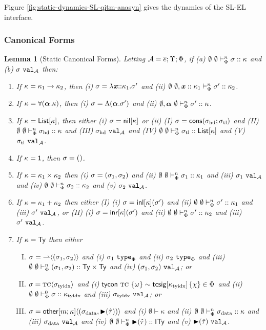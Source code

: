 \documentclass[12pt]{article}
\newtheorem{lemma}{Lemma}
\begin{document}
Figure \ref{fig:static-dynamics-SL-qitm-anasyn} gives the dynamics of the SL-EL interface.

\subsubsection{Canonical Forms}
\begin{lemma}[Static Canonical Forms]
\label{lemma:static-canonical-forms}
Letting $\mathcal{A}=\overline{e};\Upsilon;\Phi$, if (a) $\emptyset~\emptyset \vdash_{\Phi}^{n} \sigma :: \kappa$ and (b) $\sigma~\mathtt{val}_{\mathcal{A}}$ then:
\begin{enumerate}
\item If $\kappa=\kappa_1 \rightarrow \kappa_2$, then (i) $\sigma=\lambda {\textbf{\textit{x}}}{::}\kappa_1.\sigma'$ and (ii) $\emptyset~\emptyset, {\textbf{\textit{x}}} :: \kappa_1 \vdash_{\Phi}^{n} \sigma' :: \kappa_2$.
\item If $\kappa=\forall(\boldsymbol{\alpha}.\kappa)$, then (i) $\sigma=\Lambda(\boldsymbol{\alpha}.\sigma')$ and (ii) $\emptyset, \boldsymbol{\alpha}~\emptyset \vdash_{\Phi}^{n} \sigma' :: \kappa$.
\item If $\kappa={\sf List}[\kappa]$, then either (i) $\sigma={\sf nil}[\kappa]$ or (ii) (I) $\sigma={\sf cons}(\sigma_\text{hd}; \sigma_\text{tl})$ and (II) $\emptyset~\emptyset \vdash_{\Phi}^{n} \sigma_\text{hd} :: \kappa$ and (III) $\sigma_\text{hd}~\mathtt{val}_{\mathcal{A}}$ and (IV) $\emptyset~\emptyset \vdash_{\Phi}^{n} \sigma_\text{tl} :: {\sf List}[\kappa]$ and (V) $\sigma_\text{tl}~\mathtt{val}_{\mathcal{A}}$. 
\item If $\kappa={\sf 1}$, then $\sigma=()$.
\item If $\kappa=\kappa_1\times\kappa_2$ then (i) $\sigma=(\sigma_1, \sigma_2)$ and (ii) $\emptyset~\emptyset \vdash_{\Phi}^{n} \sigma_1 :: \kappa_1$ and (iii) $\sigma_1~\mathtt{val}_{\mathcal{A}}$ and (iv) $\emptyset~\emptyset \vdash_{\Phi}^{n} \sigma_2 :: \kappa_2$ and (v) $\sigma_2~\mathtt{val}_{\mathcal{A}}$. 
\item If $\kappa=\kappa_1+\kappa_2$ then either (I) (i) $\sigma={\sf inl}[\kappa](\sigma')$ and (ii) $\emptyset~\emptyset \vdash_{\Phi}^{n} \sigma' :: \kappa_1$ and (iii) $\sigma'~\mathtt{val}_{\mathcal{A}}$, or (II) (i) $\sigma={\sf inr}[\kappa](\sigma')$ and (ii) $\emptyset~\emptyset \vdash_{\Phi}^{n} \sigma' :: \kappa_2$ and (iii) $\sigma'~\mathtt{val}_{\mathcal{A}}$.
\item If $\kappa = {\sf Ty}$ then either 
    \begin{enumerate}[(I)]
    \item $\sigma = {\rightharpoonup}\langle(\sigma_1, \sigma_2)\rangle$ and (i) $\sigma_1~\mathtt{type}_{\Phi}$ and (ii) $\sigma_2~\mathtt{type}_{\Phi}$ and (iii) $\emptyset~\emptyset \vdash_{\Phi}^{n} (\sigma_1, \sigma_2) :: {\sf Ty}\times{\sf Ty}$ and (iv) $(\sigma_1, \sigma_2)~\mathtt{val}_{\mathcal{A}}$; or
    \item $\sigma = {\textsc{tc}}\langle\sigma_\text{tyidx}\rangle$ and (i) ${\sf tycon}~\textsc{tc} ~\{\omega\} \sim {\sf tcsig}[\kappa_\text{tyidx}]\,\{\chi\} \in \Phi$ and (ii) $\emptyset~\emptyset \vdash_{\Phi}^{0} \sigma :: \kappa_\text{tyidx}$ and (iii) $\sigma_\text{tyidx}~\mathtt{val}_{\mathcal{A}}$; or
    \item $\sigma = {{\sf other}[m; \kappa]}\langle(\sigma_\text{data}, {\blacktriangleright}(\hat{\tau}))\rangle$ and (i) $\emptyset \vdash \kappa$ and (ii) $\emptyset~\emptyset \vdash_{\Phi}^{n} \sigma_\text{data} :: \kappa$ and (iii) $\sigma_\text{data}~\mathtt{val}_{\mathcal{A}}$ and (iv) $\emptyset~\emptyset \vdash_{\Phi}^{n} {\blacktriangleright}(\hat{\tau}) :: {\sf ITy}$ and (v) ${\blacktriangleright}(\hat{\tau})~\mathtt{val}_{\mathcal{A}}$.

\end{enumerate}
\end{enumerate}
\end{lemma}
\end{document}
